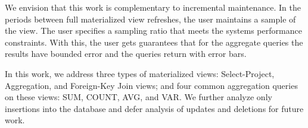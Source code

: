 We envision that this work is complementary to incremental maintenance.
In the periods between full materialized view refreshes, the user maintains a sample of the view. 
The user specifies a sampling ratio that meets the systems performance constraints.
With this, the user gets guarantees that for the aggregate queries the results have bounded error and 
the queries return with error bars.

In this work, we address three types of materialized views: Select-Project, Aggregation, and
Foreign-Key Join views; and four common aggregation queries on these
views: SUM, COUNT, AVG, and VAR. We further analyze 
only insertions into the database and defer analysis of updates
and deletions for future work.